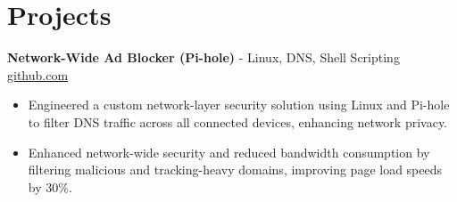 \documentclass[11pt]{article}       %
\begin{document}

\vspace{-18.5pt}

\section*{Projects}

\textbf{Network-Wide Ad Blocker (Pi-hole)}{ - Linux, DNS, Shell Scripting} \hfill \href{https://github.com/Monica20030707}{github.com} \\
\vspace{-9pt}
\begin{itemize}
  \item Engineered a custom network-layer security solution using Linux and Pi-hole to filter DNS traffic across all connected devices, enhancing network privacy.
  \item Enhanced network-wide security and reduced bandwidth consumption by filtering malicious and tracking-heavy domains, improving page load speeds by 30\%.
\end{itemize}

\end{document}
